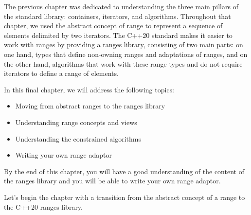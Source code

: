 The previous chapter was dedicated to understanding the three main pillars of the standard library: containers, iterators, and algorithms. Throughout that chapter, we used the abstract concept of range to represent a sequence of elements delimited by two iterators. The C++20 standard makes it easier to work with ranges by providing a ranges library, consisting of two main parts: on one hand, types that define non-owning ranges and adaptations of ranges, and on the other hand, algorithms that work with these range types and do not require iterators to define a range of elements.

In this final chapter, we will address the following topics:

\begin{itemize}
\item
Moving from abstract ranges to the ranges library

\item
Understanding range concepts and views

\item
Understanding the constrained algorithms

\item
Writing your own range adaptor
\end{itemize}

By the end of this chapter, you will have a good understanding of the content of the ranges library and you will be able to write your own range adaptor.

Let’s begin the chapter with a transition from the abstract concept of a range to the C++20 ranges library.


















